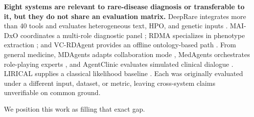 \textbf{Eight systems are relevant to rare-disease diagnosis or transferable to it, but they do not share an evaluation matrix.} DeepRare integrates more
than 40 tools and evaluates heterogeneous text, HPO, and genetic inputs
\citep{deeprare2026}. MAI-DxO coordinates a multi-role diagnostic panel
\citep{maidxo2025}; RDMA specializes in phenotype extraction
\citep{rdma2025}; and VC-RDAgent provides an offline ontology-based path
\citep{vcrdagent}. From general medicine, MDAgents adapts collaboration mode
\citep{mdagents2024}, MedAgents orchestrates role-playing experts
\citep{medagents2024}, and AgentClinic evaluates simulated clinical dialogue
\citep{agentclinic2024}. LIRICAL supplies a classical likelihood baseline
\citep{lirical2020}. Each was originally evaluated under a different input,
dataset, or metric, leaving cross-system claims unverifiable on common ground.

We position this work as filling that exact gap.

